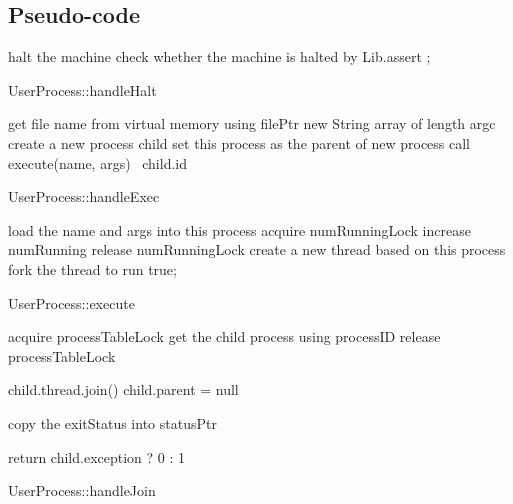 \documentclass[a4paper,10pt]{article}
\begin{document}
\subsection{Pseudo-code}


\begin{algorithm}
\DontPrintSemicolon
{}
halt the machine\;
check whether the machine is halted by Lib.assert\;
;
\caption{UserProcess::handleHalt}
\label{algo:halt}
\end{algorithm}

\begin{algorithm}
\DontPrintSemicolon
{}
get file name from virtual memory using filePtr\;
new String array of length argc\;
create a new process child\;
set this process as the parent of new process\;
call execute(name, args)\;
\Return ~child.id
\caption{UserProcess::handleExec}
\label{algo:exec}
\end{algorithm}

\begin{algorithm}
\DontPrintSemicolon
{}
load the name and args into this process\;
acquire numRunningLock\;
increase numRunning\;
release numRunningLock\;
create a new thread based on this process\;
fork the thread to run\;
\Return true;
\caption{UserProcess::execute}
\label{algo:execute}
\end{algorithm}

\begin{algorithm}
\DontPrintSemicolon
{}

acquire processTableLock\;
get the child process using processID\;
release processTableLock\;


child.thread.join()\;
child.parent = null\;

copy the exitStatus into statusPtr\;

return child.exception ? 0 : 1\;

\caption{UserProcess::handleJoin}
\label{algo:join}
\end{algorithm}
\end{document}
